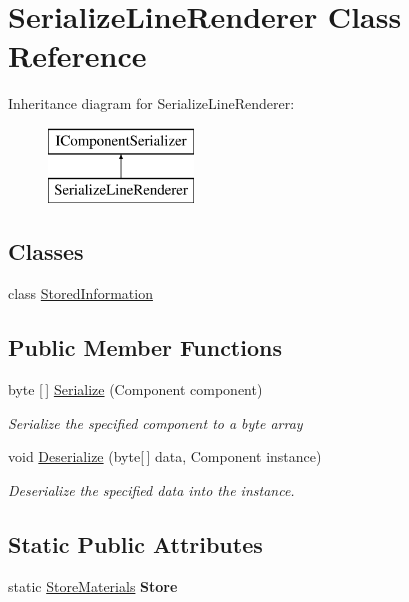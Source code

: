 \hypertarget{class_serialize_line_renderer}{}\section{Serialize\+Line\+Renderer Class Reference}
\label{class_serialize_line_renderer}
Inheritance diagram for Serialize\+Line\+Renderer\+:\begin{figure}[H]
\begin{center}
\leavevmode
\includegraphics[height=2.000000cm]{class_serialize_line_renderer}
\end{center}
\end{figure}
\subsection*{Classes}
\begin{DoxyCompactItemize}
\item 
class \hyperlink{class_serialize_line_renderer_1_1_stored_information}{Stored\+Information}
\end{DoxyCompactItemize}
\subsection*{Public Member Functions}
\begin{DoxyCompactItemize}
\item 
byte \mbox{[}$\,$\mbox{]} \hyperlink{class_serialize_line_renderer_a2e58af3caf73c033912f59f8a568f6e4}{Serialize} (Component component)
\begin{DoxyCompactList}\small\item\em Serialize the specified component to a byte array \end{DoxyCompactList}\item 
void \hyperlink{class_serialize_line_renderer_ae925ea66d21c259c560d2cbe5ccb762b}{Deserialize} (byte\mbox{[}$\,$\mbox{]} data, Component instance)
\begin{DoxyCompactList}\small\item\em Deserialize the specified data into the instance. \end{DoxyCompactList}\end{DoxyCompactItemize}
\subsection*{Static Public Attributes}
\begin{DoxyCompactItemize}
\item 
\mbox{\label{class_serialize_line_renderer_a77fab02d27de2b02dedda9798e2b6170}} 
static \hyperlink{class_store_materials}{Store\+Materials} {\bfseries Store}
\end{DoxyCompactItemize}


